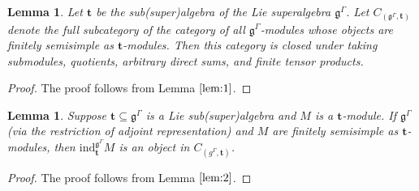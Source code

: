 \documentclass[11pt]{amsart}
\theoremstyle{plain}
\newtheorem{lemma}[thm]{Lemma}
\theoremstyle{definition}
\newcommand{\g}{\mathfrak{g}}
\begin{document}
\begin{lemma}\label{lem10}
Let $\mathbf{t}$ be the sub(super)algebra of the Lie superalgebra $\g^{\Gamma}$. Let $C_{(\g^{\Gamma},\mathbf{t})}$ denote the full subcategory of the category of all $\g^{\Gamma}$-modules whose objects are finitely semisimple as $\mathbf{t}$-modules. Then this category is closed under taking submodules, quotients, arbitrary direct sums, and finite tensor products. 
\end{lemma}
\begin{proof}
The proof follows from Lemma $\ref{lem:1}$.
\end{proof}
\begin{lemma}\label{lem11}
Suppose $\mathbf{t}\subseteq\g^{\Gamma}$ is a Lie sub(super)algebra and $M$ is a $\mathbf{t}$-module. If $\g^{\Gamma}$(via the restriction of adjoint representation) and $M$ are finitely semisimple as $\mathbf{t}$-modules, then $\mathrm{ind}^{\g^{\Gamma}}_{\mathbf{t}}M$ is an object in $C_{(g^{\Gamma}, \mathbf{t})}$.
\end{lemma}
\begin{proof}
The proof follows from Lemma $\ref{lem:2}$.
\end{proof}
\end{document}
